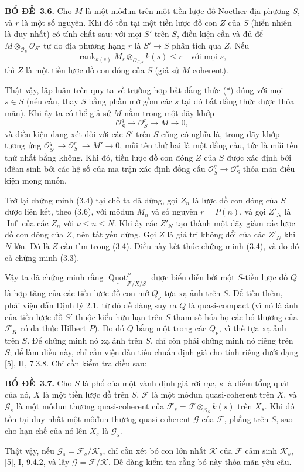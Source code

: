 \documentclass[11pt,twoside,openany]{book}
\numberwithin{equation}{section}
\newcommand{\src}[1]{%
  \phantomsection\hypertarget{src:\fgasourceid:#1}{}%
  \marginpar{\raggedleft\footnotesize\sffamily #1}%
}
\newcommand{\fgasourceid}{unset}
\newcommand{\result}[2]{\par\medskip\noindent\textbf{#1\if\relax\detokenize{#2}\relax\else\ #2\fi.}\quad}
\begin{document}
\result{BỔ ĐỀ}{3.6} Cho $M$ là một môđun trên một tiền lược đồ Noether địa
phương $S$, và $r$ là một số nguyên. Khi đó tồn tại một tiền lược đồ con $Z$
của $S$ (hiển nhiên là duy nhất) có tính chất sau: với mọi $S'$ trên $S$, điều
kiện cần và đủ để $M\otimes_{\mathcal O_S}\mathcal O_{S'}$ tự do địa phương
hạng $r$ là $S'\longrightarrow S$ phân tích qua $Z$. Nếu
\[
\operatorname{rank}_{k(s)}
M_s\otimes_{\mathcal O_{S,s}}k(s)\leq r
\quad\text{với mọi $s$},
\]
thì $Z$ là một tiền lược đồ con đóng của $S$ (giả sử $M$ coherent).
\src{264}
Thật vậy, lập luận trên quy ta về trường hợp bất đẳng thức (*) đúng với mọi
$s\in S$ (nếu cần, thay $S$ bằng phần mở gồm các $s$ tại đó bất đẳng thức
được thỏa mãn). Khi ấy ta có thể giả sử $M$ nằm trong một dãy khớp
\[
\mathcal O_S^q\longrightarrow\mathcal O_S^r\longrightarrow M\longrightarrow0,
\]
và điều kiện đang xét đối với các $S'$ trên $S$ cũng có nghĩa là, trong dãy
khớp tương ứng $\mathcal O_{S'}^q\longrightarrow\mathcal O_{S'}^r
\longrightarrow M'\longrightarrow0$, mũi tên thứ hai là một đẳng cấu, tức là
mũi tên thứ nhất bằng không. Khi đó, tiền lược đồ con đóng $Z$ của $S$ được
xác định bởi iđêan sinh bởi các hệ số của ma trận xác định đồng cấu
$\mathcal O_S^q\longrightarrow\mathcal O_S^r$ thỏa mãn điều kiện mong muốn.

Trở lại chứng minh (3.4) tại chỗ ta đã dừng, gọi $Z_n$ là lược đồ con đóng
của $S$ được liên kết, theo (3.6), với môđun $M_n$ và số nguyên $r=P(n)$, và
gọi $Z'_N$ là $\operatorname{Inf}$ của các $Z_n$ với
$\nu\leq n\leq N$. Khi ấy các $Z'_N$ tạo thành một dãy giảm các lược đồ con
đóng của $Z$, nên tất yếu dừng. Gọi $Z$ là giá trị không đổi của các
$Z'_N$ khi $N$ lớn. Đó là $Z$ cần tìm trong (3.4). Điều này kết thúc chứng
minh (3.4), và do đó cả chứng minh (3.3).

Vậy ta đã chứng minh rằng
$\underline{\operatorname{Quot}}^P_{\mathcal F/X/S}$ được biểu diễn bởi một
$S$-tiền lược đồ $Q$ là hợp tăng của các tiền lược đồ con mở $Q_\nu$ tựa xạ
ảnh trên $S$. Để tiến thêm, phải viện dẫn Định lý 2.1, từ đó dễ dàng suy ra
$Q$ là quasi-compact (vì nó là ảnh của tiền lược đồ $S'$ thuộc kiểu hữu hạn
trên $S$ tham số hóa họ các bó thương của $\mathcal F_K$ có đa thức Hilbert
$P$). Do đó $Q$ bằng một trong các $Q_\nu$, vì thế tựa xạ ảnh trên $S$. Để
chứng minh nó xạ ảnh trên $S$, chỉ còn phải chứng minh nó riêng trên $S$; để
làm điều này, chỉ cần viện dẫn tiêu chuẩn định giá cho tính riêng dưới dạng
[5], II, 7.3.8. Chỉ cần kiểm tra điều sau:

\result{BỔ ĐỀ}{3.7} Cho $S$ là phổ của một vành định giá rời rạc, $s$ là điểm
tổng quát của nó, $X$ là một tiền lược đồ trên $S$, $\mathcal F$ là một môđun
quasi-coherent trên $X$, và $\mathcal G_s$ là một môđun thương quasi-coherent
của $\mathcal F_s=\mathcal F\otimes_{\mathcal O_S}k(s)$ trên $X_s$. Khi đó
tồn tại duy nhất một môđun thương quasi-coherent $\mathcal G$ của
$\mathcal F$, phẳng trên $S$, sao cho hạn chế của nó lên $X_s$ là
$\mathcal G_s$.
\src{265}
Thật vậy, nếu $\mathcal G_s=\mathcal F_s/\mathcal K_s$, chỉ cần xét bó con lớn
nhất $\mathcal K$ của $\mathcal F$ cảm sinh $\mathcal K_s$, [5], I, 9.4.2, và
lấy $\mathcal G=\mathcal F/\mathcal K$. Dễ dàng kiểm tra rằng bó này thỏa mãn
yêu cầu.
\end{document}
